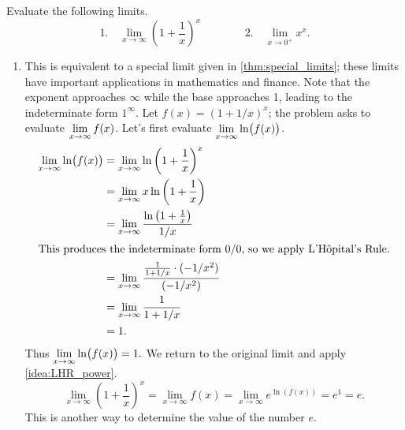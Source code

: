 \begin{example}\label{ex_LHR4}%
Evaluate the following limits.
\[
 \text{1.}\quad\lim_{x\to\infty} \left(1+\frac1x\right)^x \qquad\qquad
 \text{2.}\quad\lim_{x\to0^+} x^x.
\]
\solution
\begin{enumerate}
\item		This is equivalent to a special limit given in \autoref{thm:special_limits}; these limits have important applications in mathematics and finance. Note that the exponent approaches $\infty$ while the base approaches 1, leading to the indeterminate form $1^\infty$. Let $f(x) = (1+1/x)^x$; the problem asks to evaluate $\displaystyle\lim_{x\to\infty}f(x)$. Let's first evaluate $\displaystyle \lim_{x\to\infty}\ln\bigl(f(x)\bigr)$.
\begin{align*}
\lim_{x\to\infty}\ln\bigl(f(x)\bigr)
			&= \lim_{x\to\infty} \ln \left(1+\frac1x\right)^x \\
			&= \lim_{x\to\infty} x\ln\left(1+\frac1x\right)\\
			&= \lim_{x\to\infty} \frac{\ln\left(1+\frac1x\right)}{1/x}\\
			\intertext{This produces the indeterminate form 0/0, so we apply L'Hôpital's Rule.}
			&=	\lim_{x\to\infty} \frac{\frac{1}{1+1/x}\cdot(-1/x^2)}{(-1/x^2)} \\
			&= \lim_{x\to\infty}\frac{1}{1+1/x}\\
			&= 1.
\end{align*}
Thus $\displaystyle\lim_{x\to\infty} \ln \bigl(f(x)\bigr) = 1.$ We return to the original limit and apply \autoref{idea:LHR_power}.
\[\lim_{x\to\infty}\left(1+\frac1x\right)^x = \lim_{x\to\infty} f(x) =  \lim_{x\to\infty}e^{\ln (f(x))} = e^1 = e.\]
This is another way to determine the value of the number $e$.


\end{enumerate}
\end{example}
